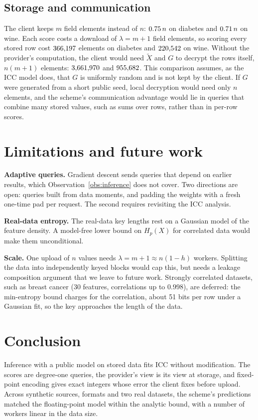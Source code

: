 \documentclass[conference]{IEEEtran}
\theoremstyle{remark}
\newcommand{\Xt}{\tilde{X}}
\begin{document}
\subsection{Storage and communication}

The client keeps $m$ field elements instead of $n$: $0.75\,n$ on diabetes and
$0.71\,n$ on wine. Each score costs a download of $\lambda=m+1$ field elements, so
scoring every stored row cost $366{,}197$ elements on diabetes and $220{,}542$ on
wine. Without the provider's computation, the client would need $\Xt$ and $G$ to decrypt the
rows itself, $n(m+1)$ elements: $3{,}661{,}970$ and $955{,}682$. This
comparison assumes, as the ICC model does, that $G$ is uniformly random and is not kept by
the client. If $G$ were generated from a short public seed, local decryption would need
only $n$ elements, and the scheme's communication advantage would lie in queries that
combine many stored values, such as sums over rows, rather than in per-row scores.

\section{Limitations and future work}

\textbf{Adaptive queries.} Gradient descent sends queries that depend on earlier results,
which Observation~\ref{obs:inference} does not cover. Two directions are open: queries
built from data moments, and padding the weights with a fresh one-time pad per request.
The second requires revisiting the ICC analysis.

\textbf{Real-data entropy.} The real-data key lengths rest on a Gaussian model of the
feature density. A model-free lower bound on $H_p(X)$ for correlated data would make them
unconditional.

\textbf{Scale.} One upload of $n$ values needs $\lambda=m+1\approx n(1-h)$ workers.
Splitting the data into independently keyed blocks would cap this, but needs a leakage
composition argument that we leave to future work. Strongly correlated datasets, such as
breast cancer (30 features, correlations up to $0.998$), are deferred: the min-entropy
bound charges for the correlation, about 51 bits per row under a Gaussian fit, so the key
approaches the length of the data.

\section{Conclusion}

Inference with a public model on stored data fits ICC without modification. The scores are
degree-one queries, the provider's view is its view at storage, and fixed-point encoding
gives exact integers whose error the client fixes before upload. Across synthetic sources,
formats and two real datasets, the scheme's predictions matched the floating-point model
within the analytic bound, with a number of workers linear in the data size.



\end{document}
